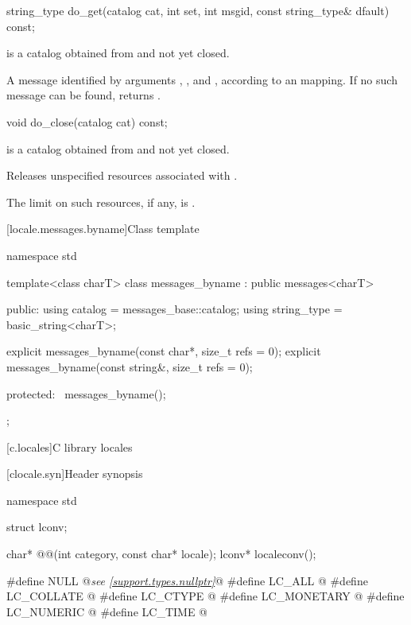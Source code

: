 %
\begin{itemdecl}
string_type do_get(catalog cat, int set, int msgid, const string_type& dfault) const;
\end{itemdecl}

\begin{itemdescr}
\pnum
\expects
{} is a catalog obtained from
and not yet closed.

\pnum
\returns
A message identified by arguments , , and , according
to an  mapping. If no
such message can be found, returns .
\end{itemdescr}

%
\begin{itemdecl}
void do_close(catalog cat) const;
\end{itemdecl}

\begin{itemdescr}
\pnum
\expects
{} is a catalog obtained from
and not yet closed.

\pnum
\effects
Releases unspecified resources associated with  .

\pnum
\remarks
The limit on such resources, if any, is .
\end{itemdescr}

[locale.messages.byname]{Class template }

%
\begin{codeblock}
namespace std {
  template<class charT>
    class messages_byname : public messages<charT> {
    public:
      using catalog     = messages_base::catalog;
      using string_type = basic_string<charT>;

      explicit messages_byname(const char*, size_t refs = 0);
      explicit messages_byname(const string&, size_t refs = 0);

    protected:
      ~messages_byname();
    };
}
\end{codeblock}

[c.locales]{C library locales}

[clocale.syn]{Header  synopsis}

%
%
%
%
%
%
%
%
%
%
\begin{codeblock}
namespace std {
  struct lconv;

  char* @@(int category, const char* locale);
  lconv* localeconv();
}

#define NULL @\textit{see \ref{support.types.nullptr}}@
#define LC_ALL @\seebelow@
#define LC_COLLATE @\seebelow@
#define LC_CTYPE @\seebelow@
#define LC_MONETARY @\seebelow@
#define LC_NUMERIC @\seebelow@
#define LC_TIME @\seebelow@
\end{codeblock}

